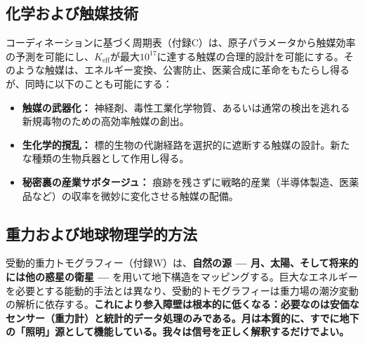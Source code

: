 \documentclass[12pt,a4paper]{article}
\theoremstyle{remark}
\newcommand{\Keff}{K_{\mathrm{eff}}}
\begin{document}
	\subsection{化学および触媒技術}
	\label{subsec:chem}
	
	コーディネーションに基づく周期表（付録C）は、原子パラメータから触媒効率の予測を可能にし、\(\Keff\)が最大\(10^{17}\)に達する触媒の合理的設計を可能にする。そのような触媒は、エネルギー変換、公害防止、医薬合成に革命をもたらし得るが、同時に以下のことも可能にする：
	\begin{itemize}[leftmargin=*]
		\item \textbf{触媒の武器化：} 神経剤、毒性工業化学物質、あるいは通常の検出を逃れる新規毒物のための高効率触媒の創出。
		\item \textbf{生化学的撹乱：} 標的生物の代謝経路を選択的に遮断する触媒の設計。新たな種類の生物兵器として作用し得る。
		\item \textbf{秘密裏の産業サボタージュ：} 痕跡を残さずに戦略的産業（半導体製造、医薬品など）の収率を微妙に変化させる触媒の配備。
	\end{itemize}
	
	\subsection{重力および地球物理学的方法}
	\label{subsec:gravity}
	
	受動的重力トモグラフィー（付録W）は、\textbf{自然の源 — 月、太陽、そして将来的には他の惑星の衛星 — } を用いて地下構造をマッピングする。巨大なエネルギーを必要とする能動的手法とは異なり、受動的トモグラフィーは重力場の潮汐変動の解析に依存する。\textbf{これにより参入障壁は根本的に低くなる：必要なのは安価なセンサー（重力計）と統計的データ処理のみである。月は本質的に、すでに地下の「照明」源として機能している。我々は信号を正しく解釈するだけでよい。}
	
\end{document}
